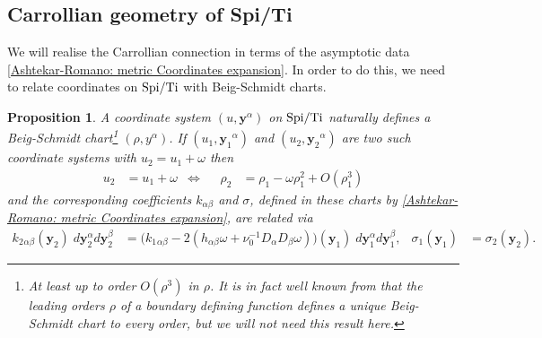 \documentclass[a4paper, 10pt]{article}
\newtheorem{proposition}{Proposition}[section]
\theoremstyle{remark}
\newcommand{\Ti}{\textnormal{Ti}}
\newcommand{\Spi}{\textnormal{Spi}}
\newcommand{\y}{\bm{y}}
\begin{document}
\subsection{Carrollian geometry of Spi/Ti}\label{ssec:carroll}

We will realise the Carrollian connection in terms of the asymptotic data \eqref{Ashtekar-Romano: metric Coordinates expansion}. In order to do this, we need to relate coordinates on $\Spi/\Ti$ with Beig-Schmidt charts.


\begin{proposition}
    A coordinate system $(u, {\y}^{\alpha})$ on $\Spi/\Ti$ naturally defines a Beig-Schmidt chart\footnote{At least up to order $O(\rho^3)$ in $\rho$. It is in fact well known from \cite{beig_einsteins_1982} that the leading orders $\rho$ of a boundary defining function defines a unique Beig-Schmidt chart to every order, but we will not need this result here.} $(\rho, {y}^{\alpha})$. If $(u_1, {\y_1}^{\alpha})$ and $(u_2, {\y_2}^{\alpha})$ are two such coordinate systems with $u_2 = u_1 + \omega$ then 
    \begin{align}\label{Carroll connection: action of supertranslation on carroll coordinates}
        u_2 &= u_1 + \omega & \Leftrightarrow && \rho_2 &= \rho_1 - \omega \rho_1^2 + O(\rho_1^3)
    \end{align}
    and the corresponding coefficients $k_{\alpha\beta}$ and $\sigma$, defined in these charts by \eqref{Ashtekar-Romano: metric Coordinates expansion}, are related via
\begin{align}\label{Carrollian connection: k transformation rules}
    k_2{}_{\alpha\beta}(\y_2) \;d\y_2^{\alpha} d\y_2^{\beta}&= \Big( k_1{}_{\alpha\beta} - 2\left( h_{\alpha \beta}\omega + \nu_0^{-1}D_{\alpha}D_{\beta}\omega\right)  \Big)(\y_1) \; d\y_1^{\alpha} d\y_1^{\beta},&
    \sigma_1(\y_1) & = \sigma_2(\y_2).
\end{align}
\end{proposition}
\end{document}
